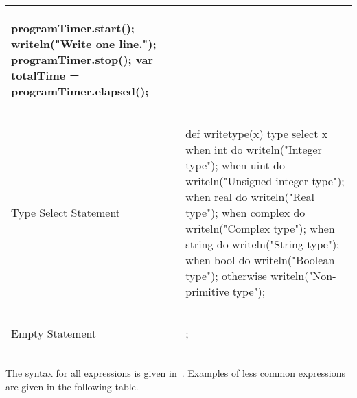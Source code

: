 \begin{center}
\begin{longtable}{|l|l|}
\begin{chapel}
programTimer.start();
writeln("Write one line.");
programTimer.stop();
var totalTime = programTimer.elapsed();
\end{chapel} \\
\hline
Type Select Statement &
\begin{chapel} %
def writetype(x) {
  type select x {
    when int do writeln("Integer type");
    when uint do writeln("Unsigned integer type");
    when real do writeln("Real type");
    when complex do writeln("Complex type");
    when string do writeln("String type");
    when bool do writeln("Boolean type");
    otherwise writeln("Non-primitive type");
  }
}
\end{chapel} \\
\hline
Empty Statement &
\begin{chapel}
;
\end{chapel} \\
\hline
\end{longtable}
\end{center}

The syntax for all expressions is given in~.  Examples
of less common expressions are given in the following table.


